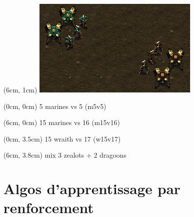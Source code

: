 \documentclass[smaller]{beamer}
\begin{document}
\begin{frame}
  \begin{textblock*}{5cm}(6cm, 1cm)
    \includegraphics[width=0.9\linewidth]{./figs/starcraft_mix_dragoon_zealot}
  \end{textblock*}

  \begin{textblock*}{5cm}(0cm, 0cm)
    5 marines vs 5 (m5v5)
  \end{textblock*}

  \begin{textblock*}{5cm}(6cm, 0cm)
    15 marines vs 16 (m15v16)
  \end{textblock*}

  \begin{textblock*}{5cm}(0cm, 3.5cm)
    15 wraith vs 17 (w15v17)
  \end{textblock*}

  \begin{textblock*}{5cm}(6cm, 3.8cm)
    mix 3 zealots + 2 dragoons
  \end{textblock*}

\end{frame}


\section{Algos d'apprentissage par renforcement}
\end{document}
